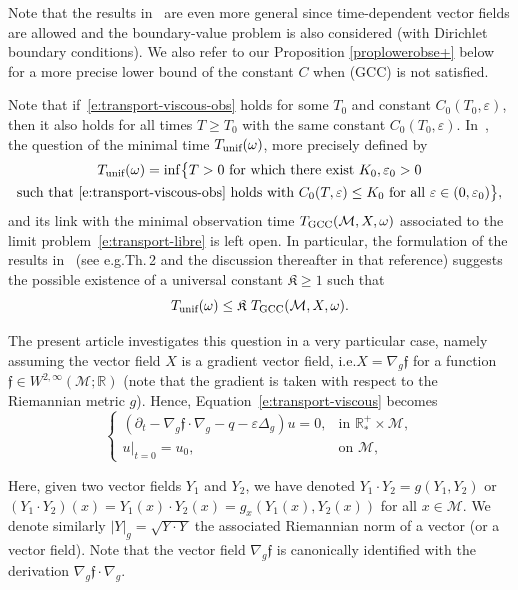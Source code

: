 \documentclass[10pt]{amsart}
\newcommand{\GCC}{\textup{GCC}}
\newcommand{\pGCC}{\textup{(GCC)}\xspace}
\newcommand{\unif}{\textup{unif}}
\theoremstyle{definition}
\newcommand{\M}{\ensuremath{\mathcal M}}
\newcommand{\mb}[1]{\ensuremath{\mathbb{#1}}}
\newcommand{\R}{{\mb{R}}}
\newcommand{\f}{\ensuremath{\mathfrak{f}}}
\let\d\partial
\let\eps\varepsilon
\let\q q
\providecommand{\eg}{e.g.}\providecommand{\ie}{i.e.}\providecommand{\etc}{etc.}
\begin{document}
Note that the results in~\cite{GL:07} are even more general since time-dependent vector fields are allowed and the boundary-value problem is also considered (with Dirichlet boundary conditions). We also refer to our Proposition \ref{proplowerobse+} below for a more precise lower bound of the constant $C$ when \pGCC is not satisfied.

Note that if~\eqref{e:transport-viscous-obs} holds for some $T_0$ and constant $C_0(T_0,\eps)$, then it also holds for all times $T\geq T_0$ with the same constant $C_0(T_0,\eps)$.
In~\cite{GL:07}, the question of the minimal time $T_{\unif}(\omega)$, more precisely defined by
\begin{multline*}
T_{\unif}(\omega) = \inf \bigl\{ T >0 \text{ for which there exist }K_0, \eps_0>0 \\
\text {such that~\eqref{e:transport-viscous-obs} holds with }C_0(T,\eps)\leq K_0 \text{ for all } \eps \in (0,\eps_0) \bigr\},
\end{multline*}
and its link with the minimal observation time $T_{\GCC}(\M,X,\omega)$ associated to the limit problem~\eqref{e:transport-libre} is left open.
In particular, the formulation of the results in~\cite{GL:07} (see \eg Th.\,2 and the discussion thereafter in that reference) suggests the possible existence of a universal constant $\mathfrak{K}\geq 1$ such that
\begin{equation}
\label{e:universal-K}
T_{\unif}(\omega) \leq \mathfrak{K}\ T_{\GCC}(\M,X,\omega).
\end{equation}

The present article investigates this question in a very particular case, namely assuming the vector field $X$ is a gradient vector field, \ie $X= \nabla_g \f$ for a function $\f\in W^{2,\infty}(\M;\R)$ (note that the gradient is taken with respect to the Riemannian metric $g$). Hence, Equation~\eqref{e:transport-viscous} becomes
\begin{equation}
\label{e:transport-viscous-gradient}
\begin{cases}
(\d_t - \nabla_g \f \cdot \nabla_g -\q - \eps \Delta_g ) u = 0, & \text{in } \R^+_*\times \M, \\
u|_{t=0} = u_0, & \text{on } \M,
\end{cases}
\end{equation}

Here, given two vector fields $Y_1$ and $Y_2$, we have denoted $Y_1\cdot Y_2 = g(Y_1,Y_2)$ or $(Y_1\cdot Y_2)(x) = Y_1(x)\cdot Y_2(x) = g_x(Y_1(x),Y_2(x))$ for all $x\in \M$. We denote similarly $|Y|_g = \sqrt{Y \cdot Y}$ the associated Riemannian norm of a vector (or a vector field).
Note that the vector field $\nabla_g \f$ is canonically identified with the derivation $\nabla_g \f \cdot \nabla_g$.
\end{document}

